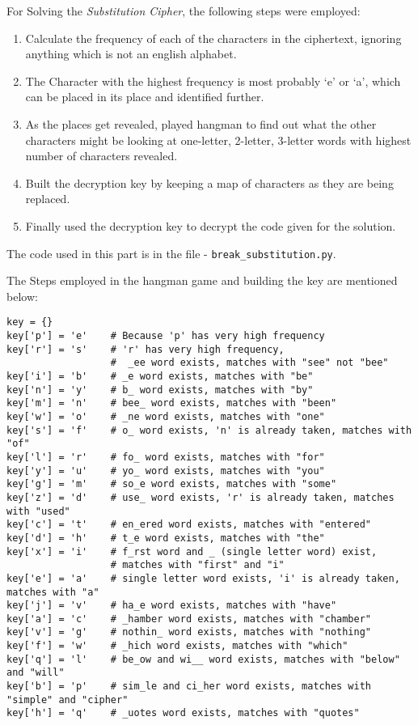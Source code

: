 \documentclass[10pt,twoside]{article}
\begin{document}
For Solving the \textit{Substitution Cipher}, the following steps were employed:
\begin{enumerate}
  \setlength\itemsep{0em}
    \item Calculate the frequency of each of the characters in the ciphertext, ignoring anything which is not an english alphabet.
    \item The Character with the highest frequency is most probably `e' or `a', which can be placed in its place and identified further.
    \item As the places get revealed, played hangman to find out what the other characters might be looking at one-letter, 2-letter, 3-letter words with highest number of characters revealed.
    \item Built the decryption key by keeping a map of characters as they are being replaced.
    \item Finally used the decryption key to decrypt the code given for the solution.
\end{enumerate}

The code used in this part is in the file - \texttt{break\_substitution.py}. \newline

The Steps employed in the hangman game and building the key are mentioned below:
\begin{verbatim}
key = {}
key['p'] = 'e'    # Because 'p' has very high frequency
key['r'] = 's'    # 'r' has very high frequency,
                  #  _ee word exists, matches with "see" not "bee"
key['i'] = 'b'    # _e word exists, matches with "be"
key['n'] = 'y'    # b_ word exists, matches with "by"
key['m'] = 'n'    # bee_ word exists, matches with "been"
key['w'] = 'o'    # _ne word exists, matches with "one"
key['s'] = 'f'    # o_ word exists, 'n' is already taken, matches with "of"
key['l'] = 'r'    # fo_ word exists, matches with "for"
key['y'] = 'u'    # yo_ word exists, matches with "you"
key['g'] = 'm'    # so_e word exists, matches with "some"
key['z'] = 'd'    # use_ word exists, 'r' is already taken, matches with "used"
key['c'] = 't'    # en_ered word exists, matches with "entered"
key['d'] = 'h'    # t_e word exists, matches with "the"
key['x'] = 'i'    # f_rst word and _ (single letter word) exist,
                  # matches with "first" and "i"
key['e'] = 'a'    # single letter word exists, 'i' is already taken, matches with "a"
key['j'] = 'v'    # ha_e word exists, matches with "have"
key['a'] = 'c'    # _hamber word exists, matches with "chamber"
key['v'] = 'g'    # nothin_ word exists, matches with "nothing"
key['f'] = 'w'    # _hich word exists, matches with "which"
key['q'] = 'l'    # be_ow and wi__ word exists, matches with "below" and "will"
key['b'] = 'p'    # sim_le and ci_her word exists, matches with "simple" and "cipher"
key['h'] = 'q'    # _uotes word exists, matches with "quotes"
\end{verbatim}
\end{document}
